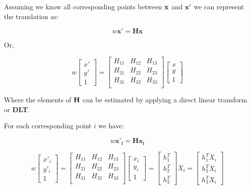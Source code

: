 \documentclass{article}
\begin{document}
Assuming we know all corresponding points between $\bf x$ and $\bf x'$ we can represent the translation as:

\[
  w \mathbf{x'} = \mathbf{Hx}
\]

Or,

\[
  w \begin{bmatrix}
    x' \\ y' \\ 1
  \end{bmatrix} =
  \begin{bmatrix}
    H_{1 1} & H_{1 2} & H_{1 3} \\
    H_{2 1} & H_{2 2} & H_{2 3} \\
    H_{3 1} & H_{3 2} & H_{3 3} \\
  \end{bmatrix}
  \begin{bmatrix}
    x \\ y \\ 1
  \end{bmatrix}
\]

Where the elements of $\bf H$ can be estimated by applying a direct linear transform or \textbf{DLT}.

For each corresponding point $i$ we have:


\[
  w \mathbf{x'_{i}} = \mathbf{Hx_{i}}
\]

\[
  w \begin{bmatrix}
    x'_{i} \\ y'_{i} \\ 1
  \end{bmatrix} =
  \begin{bmatrix}
    H_{1 1} & H_{1 2} & H_{1 3} \\
    H_{2 1} & H_{2 2} & H_{2 3} \\
    H_{3 1} & H_{3 2} & H_{3 3} \\
  \end{bmatrix}
  \begin{bmatrix}
    x_{i}\\ y_{i} \\ 1
  \end{bmatrix} =
  \begin{bmatrix}
    h_{1}^{T} \\ h_{2}^{T} \\ h_{3}^{T}
  \end{bmatrix}X_{i} = \begin{bmatrix}
    h_{1}^{T}X_{i} \\ h_{2}^{T}X_{i} \\ h_{3}^{T}X_{i}
  \end{bmatrix}
\]
\end{document}
